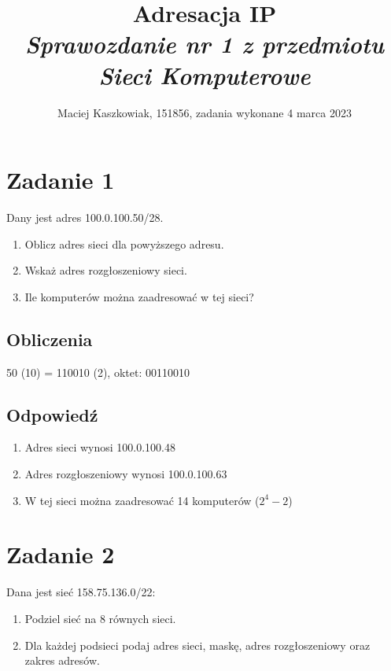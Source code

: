 \documentclass[polish, a4paper]{article}
\title{Adresacja IP \\
        \Large \emph{Sprawozdanie nr 1 z przedmiotu Sieci Komputerowe}}
\author{Maciej Kaszkowiak, 151856, zadania wykonane 4 marca 2023}
\date{\vspace{-5ex}} %
\begin{document}
\maketitle

\tableofcontents

\section{Zadanie 1}

Dany jest adres 100.0.100.50/28.

\begin{enumerate}
\item{Oblicz adres sieci dla powyższego adresu.}
\item{Wskaż adres rozgłoszeniowy sieci.}
\item{Ile komputerów można zaadresować w tej sieci?}
\end{enumerate}

\subsection{Obliczenia}

50 (10) = 110010 (2), oktet: 00110010

\subsection{Odpowiedź}

\begin{enumerate}
\item{Adres sieci wynosi 100.0.100.48}
\item{Adres rozgłoszeniowy wynosi 100.0.100.63}
\item{W tej sieci można zaadresować 14 komputerów ($2^4 - 2$)}

\end{enumerate}

\section{Zadanie 2}
Dana jest sieć 158.75.136.0/22:

\begin{enumerate}
\item{Podziel sieć na 8 równych sieci.}
\item{Dla każdej podsieci podaj adres sieci, maskę, adres rozgłoszeniowy oraz zakres adresów.}
\end{enumerate}
\end{document}
